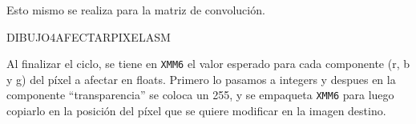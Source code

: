         Esto mismo se realiza para la matriz de convolución.
          
        DIBUJO4AFECTARPIXELASM

        Al finalizar el ciclo, se tiene en \texttt{XMM6} el valor esperado para cada componente (r, b y g) del píxel a afectar en floats. Primero lo pasamos a integers y despues en la componente “transparencia” se coloca un 255, y se empaqueta \texttt{XMM6} para luego copiarlo en la posición del píxel que se quiere modificar en la imagen destino. 